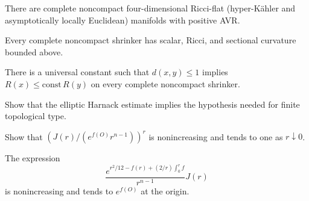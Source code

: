 \begin{remark}
\label{rem:chow-iv-ricci-flat-positive-avr}

There are complete noncompact four-dimensional Ricci-flat (hyper-K\"ahler and
asymptotically locally Euclidean) manifolds with positive AVR.
\end{remark}

\begin{conjecture}
\label{conj:chow-iv-bounded-curvature-conjecture}
Every complete noncompact shrinker has scalar, Ricci, and sectional curvature
bounded above.
\end{conjecture}

\begin{conjecture}
\label{conj:chow-iv-elliptic-harnack}
There is a universal constant such that $d(x,y)\le1$ implies
$R(x)\le\mathrm{const}\,R(y)$ on every complete noncompact shrinker.
\end{conjecture}

\begin{claim}
\label{ex:chow-iv-harnack-topology}
Show that the elliptic Harnack estimate implies the hypothesis needed for finite
topological type.
\end{claim}

\begin{claim}
\label{ex:chow-iv-radial-density-monotone}
Show that $\left(J(r)/(e^{f(O)}r^{n-1})\right)^r$ is nonincreasing and tends to
one as $r\downarrow0$.
\end{claim}

\begin{claim}
\label{ex:chow-iv-second-radial-density}
The expression
\[
\frac{e^{r^2/12-f(r)+(2/r)\int_0^rf}}{r^{n-1}}J(r)
\]
is nonincreasing and tends to $e^{f(O)}$ at the origin.
\end{claim}

